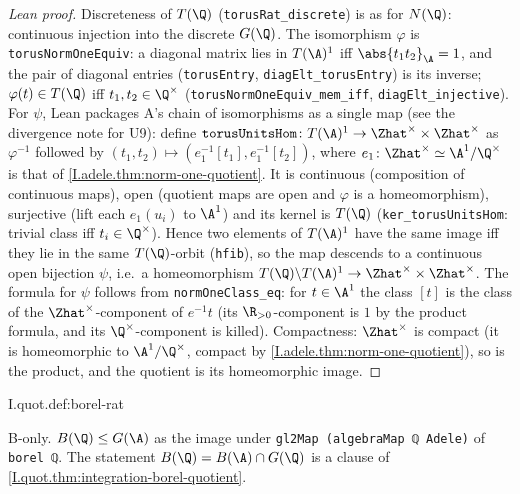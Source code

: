 \begin{proof}[Lean proof]
Discreteness of $T(\Q)$ (\texttt{torusRat\_discrete}) is as for $N(\Q)$: continuous injection into the discrete $G(\Q)$. The isomorphism $\varphi$ is \texttt{torusNormOneEquiv}: a diagonal matrix lies in $T(\A)^1$ iff $\abs{t_1t_2}_\A=1$, and the pair of diagonal entries (\texttt{torusEntry}, \texttt{diagElt\_torusEntry}) is its inverse; $\varphi(t)\in T(\Q)$ iff $t_1,t_2\in\Q^\times$ (\texttt{torusNormOneEquiv\_mem\_iff}, \texttt{diagElt\_injective}). For $\psi$, Lean packages A's chain of isomorphisms as a single map (see the divergence note for U9): define $\texttt{torusUnitsHom}\colon T(\A)^1\to\Zhat^\times\times\Zhat^\times$ as $\varphi^{-1}$ followed by $(t_1,t_2)\mapsto(e_1^{-1}[t_1],e_1^{-1}[t_2])$, where $e_1\colon\Zhat^\times\simeq\A^1/\Q^\times$ is that of \cref{I.adele.thm:norm-one-quotient}. It is continuous (composition of continuous maps), open (quotient maps are open and $\varphi$ is a homeomorphism), surjective (lift each $e_1(u_i)$ to $\A^1$) and its kernel is $T(\Q)$ (\texttt{ker\_torusUnitsHom}: trivial class iff $t_i\in\Q^\times$). Hence two elements of $T(\A)^1$ have the same image iff they lie in the same $T(\Q)$-orbit (\texttt{hfib}), so the map descends to a continuous open bijection $\psi$, i.e.\ a homeomorphism $T(\Q)\backslash T(\A)^1\to\Zhat^\times\times\Zhat^\times$. The formula for $\psi$ follows from \texttt{normOneClass\_eq}: for $t\in\A^1$ the class $[t]$ is the class of the $\Zhat^\times$-component of $e^{-1}t$ (its $\R_{>0}$-component is $1$ by the product formula, and its $\Q^\times$-component is killed). Compactness: $\Zhat^\times$ is compact (it is homeomorphic to $\A^1/\Q^\times$, compact by \cref{I.adele.thm:norm-one-quotient}), so is the product, and the quotient is its homeomorphic image.
\end{proof}

\begin{definition}[$B(\Q)$ inside $G(\A)$]
\bonly
{}
\end{definition}
\begin{tfformal}{I.quot.def:borel-rat}
\begin{tffidelity}
B-only. $B(\Q)\le G(\A)$ as the image under \texttt{gl2Map (algebraMap ℚ Adele)} of \texttt{borel ℚ}. The statement $B(\Q)=B(\A)\cap G(\Q)$ is a clause of \cref{I.quot.thm:integration-borel-quotient}.
\end{tffidelity}
\end{tfformal}

